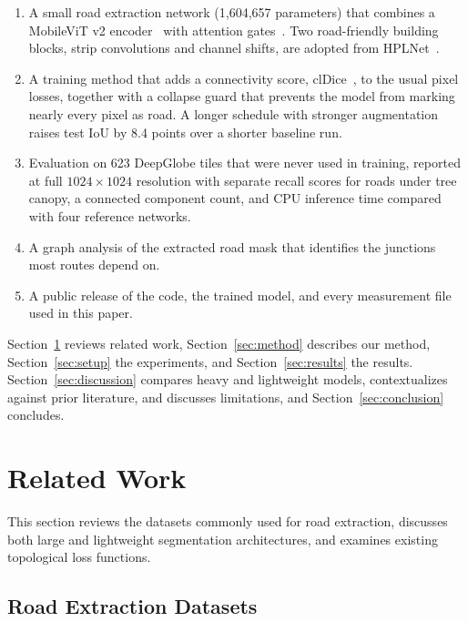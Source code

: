 \documentclass{ieeeaccess}
\begin{document}
\begin{enumerate}

\item A small road extraction network (1,604,657 parameters) that combines a MobileViT v2 encoder~\cite{mehta2023separable} with attention gates~\cite{oktay2018attention}. Two road-friendly building blocks, strip convolutions and channel shifts, are adopted from HPLNet~\cite{cui2025hplnet}.

\item A training method that adds a connectivity score, clDice~\cite{shit2021cldice}, to the usual pixel losses, together with a collapse guard that prevents the model from marking nearly every pixel as road. A longer schedule with stronger augmentation raises test IoU by 8.4 points over a shorter baseline run.

\item Evaluation on 623 DeepGlobe tiles that were never used in training, reported at full $1024 \times 1024$ resolution with separate recall scores for roads under tree canopy, a connected component count, and CPU inference time compared with four reference networks.

\item A graph analysis of the extracted road mask that identifies the junctions most routes depend on.

\item A public release of the code, the trained model, and every measurement file used in this paper.

\end{enumerate}

Section~\ref{sec:related} reviews related work, Section~\ref{sec:method} describes our method, Section~\ref{sec:setup} the experiments, and Section~\ref{sec:results} the results. Section~\ref{sec:discussion} compares heavy and lightweight models, contextualizes against prior literature, and discusses limitations, and Section~\ref{sec:conclusion} concludes.

\section{Related Work}
\label{sec:related}

This section reviews the datasets commonly used for road extraction, discusses both large and lightweight segmentation architectures, and examines existing topological loss functions.

\subsection{Road Extraction Datasets}
\end{document}
